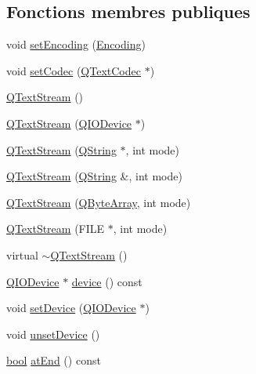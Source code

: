 \subsection*{Fonctions membres publiques}
\begin{DoxyCompactItemize}
\item 
void \hyperlink{class_q_text_stream_ad06dc1f99476aed01fa8a822e871dc44}{set\+Encoding} (\hyperlink{class_q_text_stream_aeaa17ac9a577eb636e8fd337115da817}{Encoding})
\item 
void \hyperlink{class_q_text_stream_a18bdd4ae41cd9b37ec06827658fbf447}{set\+Codec} (\hyperlink{class_q_text_codec}{Q\+Text\+Codec} $\ast$)
\item 
\hyperlink{class_q_text_stream_aa7bbd71ba288daceba843f54f0c306a4}{Q\+Text\+Stream} ()
\item 
\hyperlink{class_q_text_stream_a431c964c498560a2459d55808ccaff89}{Q\+Text\+Stream} (\hyperlink{class_q_i_o_device}{Q\+I\+O\+Device} $\ast$)
\item 
\hyperlink{class_q_text_stream_a7abe6ca8fe34120632550a88c6f67cc5}{Q\+Text\+Stream} (\hyperlink{class_q_string}{Q\+String} $\ast$, int mode)
\item 
\hyperlink{class_q_text_stream_a917a19a834861178ce1a7c57ee37ec41}{Q\+Text\+Stream} (\hyperlink{class_q_string}{Q\+String} \&, int mode)
\item 
\hyperlink{class_q_text_stream_a00d490a0530b4bcd9554b9316815d35a}{Q\+Text\+Stream} (\hyperlink{qcstring_8h_ad6a390648110655c217fe072d45fbcf5}{Q\+Byte\+Array}, int mode)
\item 
\hyperlink{class_q_text_stream_a53439eda88c78b200b675b7909343b10}{Q\+Text\+Stream} (F\+I\+L\+E $\ast$, int mode)
\item 
virtual \hyperlink{class_q_text_stream_a5c3a2ab73dceff949ec36db41df64944}{$\sim$\+Q\+Text\+Stream} ()
\item 
\hyperlink{class_q_i_o_device}{Q\+I\+O\+Device} $\ast$ \hyperlink{class_q_text_stream_ada5cbf6e2417038be62066f4f530569d}{device} () const 
\item 
void \hyperlink{class_q_text_stream_a20bb0f4064d19330d4ed6bb56299fba7}{set\+Device} (\hyperlink{class_q_i_o_device}{Q\+I\+O\+Device} $\ast$)
\item 
void \hyperlink{class_q_text_stream_a6d8aeebd7f4b1cc9f2dce27f6a0d9bd9}{unset\+Device} ()
\item 
\hyperlink{qglobal_8h_a1062901a7428fdd9c7f180f5e01ea056}{bool} \hyperlink{class_q_text_stream_acf0077e95c95ce7a91bf106cef99e0fb}{at\+End} () const 
\item 

\end{DoxyCompactItemize}
